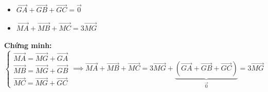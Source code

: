 \documentclass[12pt,a4paper]{extarticle}
\begin{document}
    \begin{center}
        \begin{minipage}{0.4\textwidth}
            \centering
        \end{minipage}
        \hfill
        \begin{minipage}{0.55\textwidth}
            \begin{itemize}[label=$\bullet$, leftmargin=*]
                \item $\vec{GA} + \vec{GB} + \vec{GC} = \vec{0}$
                \item $\vec{MA} + \vec{MB} + \vec{MC} = 3\vec{MG}$
            \end{itemize}
        \end{minipage}
    \end{center}
    \textbf{Chứng minh:}
    \[
    \begin{cases}
        \vec{MA} = \vec{MG} + \vec{GA} \\
        \vec{MB} = \vec{MG} + \vec{GB} \\
        \vec{MC} = \vec{MG} + \vec{GC}
    \end{cases}
    \implies \vec{MA} + \vec{MB} + \vec{MC} = 3\vec{MG} + \underbrace{(\vec{GA} + \vec{GB} + \vec{GC})}_{\vec{0}} = 3\vec{MG}
    \]
\end{document}
